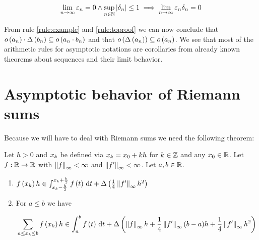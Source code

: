 \begin{align}
  \lim_{n\to\infty} \epsilon_n = 0 \land \sup_{n\in\N} \abs{\delta_n} \le 1 \implies \lim_{n\to\infty} \epsilon_n \delta_n = 0
\end{align}

From rule \ref{rule:example} and \ref{rule:toproof} we can now conclude that $\littleo{a_n} \cdot \bigabs{b_n} \subseteq \littleo{a_n \cdot b_n}$ and that $\littleo{\bigabs{a_n}} \subseteq \littleo{a_n}$. We see that most of the arithmetic rules for asymptotic notations are corollaries from already known theorems about sequences and their limit behavior.

\section{Asymptotic behavior of Riemann sums}

Because we will have to deal with Riemann sums we need the following theorem:

\begin{theorem} \label{thm:arithmetic_rules}
  Let $h > 0$ and $\x[k]$ be defined via $\x[k] = \x[0] + kh$ for $k\in\Z$ and any $\x[0]\in\R$. Let $f:\R\to\R$ with $\snorm{f} < \infty$ and $\snorm{f'} < \infty$. Let $a,b\in\R$.

  \begin{enumerate}
    \item $\f{\x} h \in \int_{\x-\frac h2}^{\x + \frac h2} \f{t}\d{t} + \bigabs{\frac 14 \snorm{f'} h^2}$
    \item For $a \le b$ we have

      \begin{align}
        \sum_{a \le \x \le b} \f{\x} h \in \int_a^b \f{t}\d{t} + \bigabs{\snorm{f} h + \frac 14 \snorm{f'}(b-a)h + \frac 14 \snorm{f'}h^2}
      \end{align}
  \end{enumerate}
\end{theorem}

